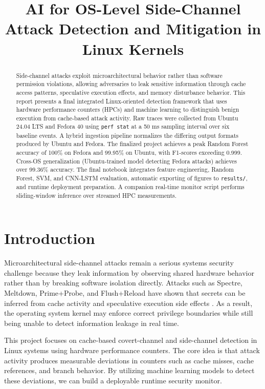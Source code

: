 \documentclass[conference]{IEEEtran}
\title{AI for OS-Level Side-Channel Attack Detection and Mitigation in Linux Kernels}
\author{
\IEEEauthorblockN{[Your Name]}
\IEEEauthorblockA{
Roll No.: [Your Roll Number] \\
Department / Institution: [Your Department and Institution] \\
Workspace: \texttt{\textasciitilde/SideChannelAI}
}
}
\begin{document}
\maketitle

\begin{abstract}
Side-channel attacks exploit microarchitectural behavior rather than software permission violations, allowing adversaries to leak sensitive information through cache access patterns, speculative execution effects, and memory disturbance behavior. This report presents a final integrated Linux-oriented detection framework that uses hardware performance counters (HPCs) and machine learning to distinguish benign execution from cache-based attack activity. Raw traces were collected from Ubuntu 24.04 LTS and Fedora 40 using \texttt{perf stat} at a 50 ms sampling interval over six baseline events. A hybrid ingestion pipeline normalizes the differing output formats produced by Ubuntu and Fedora. The finalized project achieves a peak Random Forest accuracy of 100\% on Fedora and 99.95\% on Ubuntu, with F1-scores exceeding 0.999. Cross-OS generalization (Ubuntu-trained model detecting Fedora attacks) achieves over 99.36\% accuracy. The final notebook integrates feature engineering, Random Forest, SVM, and CNN-LSTM evaluation, automatic exporting of figures to \texttt{results/}, and runtime deployment preparation. A companion real-time monitor script performs sliding-window inference over streamed HPC measurements.
\end{abstract}

\section{Introduction}
Microarchitectural side-channel attacks remain a serious systems security challenge because they leak information by observing shared hardware behavior rather than by breaking software isolation directly. Attacks such as Spectre, Meltdown, Prime+Probe, and Flush+Reload have shown that secrets can be inferred from cache activity and speculative execution side effects \cite{spectre,meltdown,yarom,liu}. As a result, the operating system kernel may enforce correct privilege boundaries while still being unable to detect information leakage in real time.

This project focuses on cache-based covert-channel and side-channel detection in Linux systems using hardware performance counters. The core idea is that attack activity produces measurable deviations in counters such as cache misses, cache references, and branch behavior. By utilizing machine learning models to detect these deviations, we can build a deployable runtime security monitor. 
\end{document}
